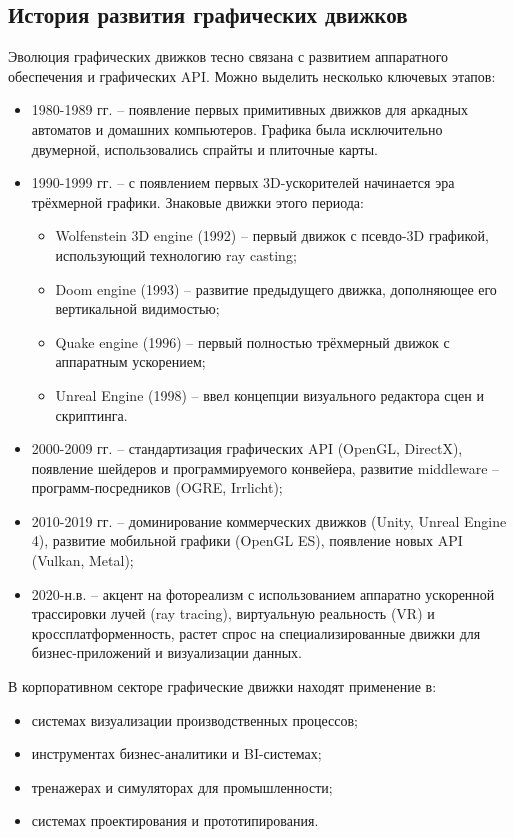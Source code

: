 \subsection{История развития графических движков}

Эволюция графических движков тесно связана с развитием аппаратного обеспечения и графических API. Можно выделить несколько ключевых этапов:

\begin{itemize}
\item 1980-1989 гг. -- появление первых примитивных движков для аркадных автоматов и домашних компьютеров. Графика была исключительно двумерной, использовались спрайты и плиточные карты.
\item 1990-1999 гг. -- с появлением первых 3D-ускорителей начинается эра трёхмерной графики. Знаковые движки этого периода:
    \begin{itemize}[itemindent=\parindent,leftmargin=\parindent]
    \item Wolfenstein 3D engine (1992) -- первый движок с псевдо-3D графикой, использующий технологию ray casting;
    \item Doom engine (1993) -- развитие предыдущего движка, дополняющее его вертикальной видимостью;
    \item Quake engine (1996) -- первый полностью трёхмерный движок с аппаратным ускорением;
    \item Unreal Engine (1998) -- ввел концепции визуального редактора сцен и скриптинга.
    \end{itemize}
\item 2000-2009 гг. -- стандартизация графических API (OpenGL, DirectX), появление шейдеров и программируемого конвейера, развитие middleware -- программ-посредников (OGRE, Irrlicht);
\item 2010-2019 гг. -- доминирование коммерческих движков (Unity, Unreal Engine 4), развитие мобильной графики (OpenGL ES), появление новых API (Vulkan, Metal);
\item 2020-н.в. -- акцент на фотореализм с использованием аппаратно ускоренной трассировки лучей (ray tracing), виртуальную реальность (VR) и кроссплатформенность, растет спрос на специализированные движки для бизнес-приложений и визуализации данных.
\end{itemize}

В корпоративном секторе графические движки находят применение в:
\begin{itemize}
\item системах визуализации производственных процессов;
\item инструментах бизнес-аналитики и BI-системах;
\item тренажерах и симуляторах для промышленности;
\item системах проектирования и прототипирования.
\end{itemize}

